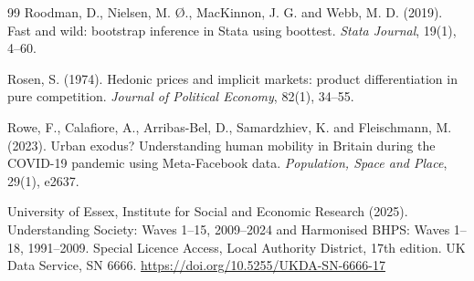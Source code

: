 \documentclass[11pt,a4paper]{article}
\begin{document}
\begin{thebibliography}{99}
Roodman, D., Nielsen, M. {\O}., MacKinnon, J. G. and Webb, M. D. (2019). Fast and wild: bootstrap inference in Stata using boottest. \textit{Stata Journal}, 19(1), 4--60.

Rosen, S. (1974). Hedonic prices and implicit markets: product differentiation in pure competition. \textit{Journal of Political Economy}, 82(1), 34--55.

Rowe, F., Calafiore, A., Arribas-Bel, D., Samardzhiev, K. and Fleischmann, M. (2023). Urban exodus? Understanding human mobility in Britain during the COVID-19 pandemic using Meta-Facebook data. \textit{Population, Space and Place}, 29(1), e2637.

University of Essex, Institute for Social and Economic Research (2025). Understanding Society: Waves 1--15, 2009--2024 and Harmonised BHPS: Waves 1--18, 1991--2009. Special Licence Access, Local Authority District, 17th edition. UK Data Service, SN 6666. \url{https://doi.org/10.5255/UKDA-SN-6666-17}

\end{thebibliography}
\end{document}
